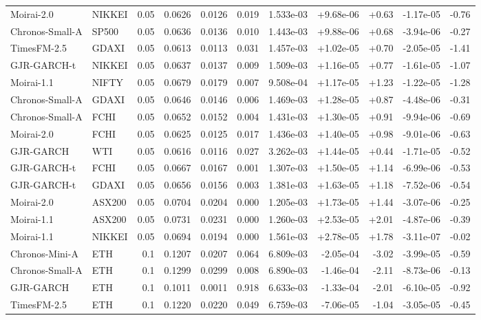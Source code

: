 \begin{tabular}{llrrrrrrrrr}
Moirai-2.0 & NIKKEI & 0.05 & 0.0626 & 0.0126 & 0.019 & 1.533e-03 & +9.68e-06 & +0.63 & -1.17e-05 & -0.76 \\
Chronos-Small-A & SP500 & 0.05 & 0.0636 & 0.0136 & 0.010 & 1.443e-03 & +9.88e-06 & +0.68 & -3.94e-06 & -0.27 \\
TimesFM-2.5 & GDAXI & 0.05 & 0.0613 & 0.0113 & 0.031 & 1.457e-03 & +1.02e-05 & +0.70 & -2.05e-05 & -1.41 \\
GJR-GARCH-t & NIKKEI & 0.05 & 0.0637 & 0.0137 & 0.009 & 1.509e-03 & +1.16e-05 & +0.77 & -1.61e-05 & -1.07 \\
Moirai-1.1 & NIFTY & 0.05 & 0.0679 & 0.0179 & 0.007 & 9.508e-04 & +1.17e-05 & +1.23 & -1.22e-05 & -1.28 \\
Chronos-Small-A & GDAXI & 0.05 & 0.0646 & 0.0146 & 0.006 & 1.469e-03 & +1.28e-05 & +0.87 & -4.48e-06 & -0.31 \\
Chronos-Small-A & FCHI & 0.05 & 0.0652 & 0.0152 & 0.004 & 1.431e-03 & +1.30e-05 & +0.91 & -9.94e-06 & -0.69 \\
Moirai-2.0 & FCHI & 0.05 & 0.0625 & 0.0125 & 0.017 & 1.436e-03 & +1.40e-05 & +0.98 & -9.01e-06 & -0.63 \\
GJR-GARCH & WTI & 0.05 & 0.0616 & 0.0116 & 0.027 & 3.262e-03 & +1.44e-05 & +0.44 & -1.71e-05 & -0.52 \\
GJR-GARCH-t & FCHI & 0.05 & 0.0667 & 0.0167 & 0.001 & 1.307e-03 & +1.50e-05 & +1.14 & -6.99e-06 & -0.53 \\
GJR-GARCH-t & GDAXI & 0.05 & 0.0656 & 0.0156 & 0.003 & 1.381e-03 & +1.63e-05 & +1.18 & -7.52e-06 & -0.54 \\
Moirai-2.0 & ASX200 & 0.05 & 0.0704 & 0.0204 & 0.000 & 1.205e-03 & +1.73e-05 & +1.44 & -3.07e-06 & -0.25 \\
Moirai-1.1 & ASX200 & 0.05 & 0.0731 & 0.0231 & 0.000 & 1.260e-03 & +2.53e-05 & +2.01 & -4.87e-06 & -0.39 \\
Moirai-1.1 & NIKKEI & 0.05 & 0.0694 & 0.0194 & 0.000 & 1.561e-03 & +2.78e-05 & +1.78 & -3.11e-07 & -0.02 \\
Chronos-Mini-A & ETH & 0.1 & 0.1207 & 0.0207 & 0.064 & 6.809e-03 & -2.05e-04 & -3.02 & -3.99e-05 & -0.59 \\
Chronos-Small-A & ETH & 0.1 & 0.1299 & 0.0299 & 0.008 & 6.890e-03 & -1.46e-04 & -2.11 & -8.73e-06 & -0.13 \\
GJR-GARCH & ETH & 0.1 & 0.1011 & 0.0011 & 0.918 & 6.633e-03 & -1.33e-04 & -2.01 & -6.10e-05 & -0.92 \\
TimesFM-2.5 & ETH & 0.1 & 0.1220 & 0.0220 & 0.049 & 6.759e-03 & -7.06e-05 & -1.04 & -3.05e-05 & -0.45 \\

\end{tabular}
